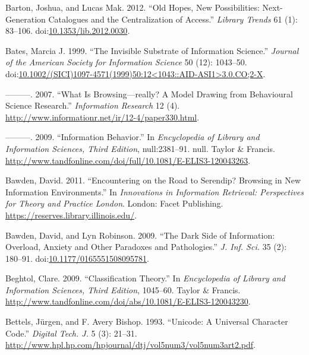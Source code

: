\documentclass[]{article}
\begin{document}
\hypertarget{ref-bartonux5foldux5f2012}{}
Barton, Joshua, and Lucas Mak. 2012. ``Old Hopes, New Possibilities:
Next-Generation Catalogues and the Centralization of Access.''
\emph{Library Trends} 61 (1): 83--106.
doi:\href{https://doi.org/10.1353/lib.2012.0030}{10.1353/lib.2012.0030}.

\hypertarget{ref-batesux5finvisibleux5f1999}{}
Bates, Marcia J. 1999. ``The Invisible Substrate of Information
Science.'' \emph{Journal of the American Society for Information
Science} 50 (12): 1043--50.
doi:\href{https://doi.org/10.1002/(SICI)1097-4571(1999)50:12\%3C1043::AID-ASI1\%3E3.0.CO;2-X}{10.1002/(SICI)1097-4571(1999)50:12\textless{}1043::AID-ASI1\textgreater{}3.0.CO;2-X}.

\hypertarget{ref-batesux5fwhatux5f2007}{}
---------. 2007. ``What Is Browsing---really? A Model Drawing from
Behavioural Science Research.'' \emph{Information Research} 12 (4).
\url{http://www.informationr.net/ir/12-4/paper330.html}.

\hypertarget{ref-batesux5finformationux5f2009}{}
---------. 2009. ``Information Behavior.'' In \emph{Encyclopedia of
Library and Information Sciences, Third Edition}, null:2381--91. null.
Taylor \& Francis.
\url{http://www.tandfonline.com/doi/full/10.1081/E-ELIS3-120043263}.

\hypertarget{ref-bawdenux5fencounteringux5f2011}{}
Bawden, David. 2011. ``Encountering on the Road to Serendip? Browsing in
New Information Environments.'' In \emph{Innovations in Information
Retrieval: Perspectives for Theory and Practice London}. London: Facet
Publishing. \url{https://reserves.library.illinois.edu/}.

\hypertarget{ref-bawdenux5fdarkux5f2009}{}
Bawden, David, and Lyn Robinson. 2009. ``The Dark Side of Information:
Overload, Anxiety and Other Paradoxes and Pathologies.'' \emph{J. Inf.
Sci.} 35 (2): 180--91.
doi:\href{https://doi.org/10.1177/0165551508095781}{10.1177/0165551508095781}.

\hypertarget{ref-beghtolux5fclassificationux5f2009}{}
Beghtol, Clare. 2009. ``Classification Theory.'' In \emph{Encyclopedia
of Library and Information Sciences, Third Edition}, 1045--60. Taylor \&
Francis.
\url{http://www.tandfonline.com/doi/abs/10.1081/E-ELIS3-120043230}.

\hypertarget{ref-bettelsux5funicode:ux5f1993}{}
Bettels, Jürgen, and F. Avery Bishop. 1993. ``Unicode: A Universal
Character Code.'' \emph{Digital Tech. J.} 5 (3): 21--31.
\url{http://www.hpl.hp.com/hpjournal/dtj/vol5num3/vol5num3art2.pdf}.
\end{document}
